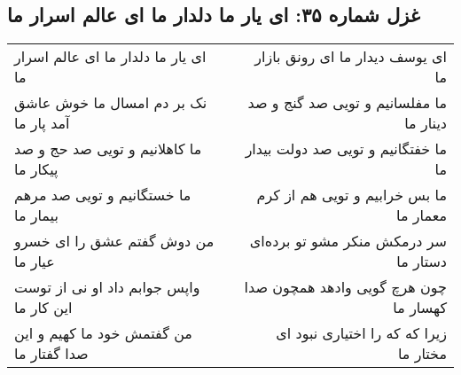 \begin{center}
\section*{غزل شماره ۳۵: ای یار ما دلدار ما ای عالم اسرار ما}
\label{sec:0035}
\begin{longtable}{l p{0.5cm} r}
ای یار ما دلدار ما ای عالم اسرار ما
&&
ای یوسف دیدار ما ای رونق بازار ما
\\
نک بر دم امسال ما خوش عاشق آمد پار ما
&&
ما مفلسانیم و تویی صد گنج و صد دینار ما
\\
ما کاهلانیم و تویی صد حج و صد پیکار ما
&&
ما خفتگانیم و تویی صد دولت بیدار ما
\\
ما خستگانیم و تویی صد مرهم بیمار ما
&&
ما بس خرابیم و تویی هم از کرم معمار ما
\\
من دوش گفتم عشق را ای خسرو عیار ما
&&
سر درمکش منکر مشو تو برده‌ای دستار ما
\\
واپس جوابم داد او نی از توست این کار ما
&&
چون هرچ گویی وادهد همچون صدا کهسار ما
\\
من گفتمش خود ما کهیم و این صدا گفتار ما
&&
زیرا که که را اختیاری نبود ای مختار ما
\\
\end{longtable}
\end{center}
